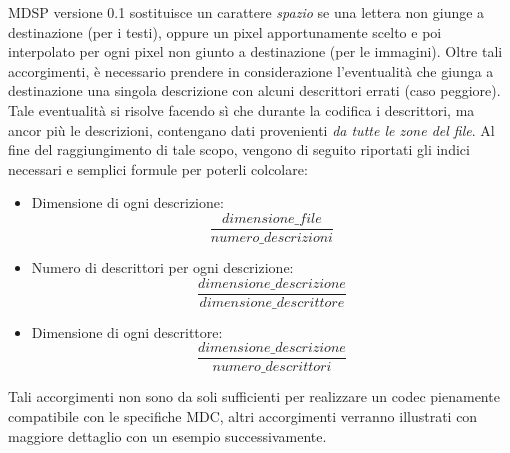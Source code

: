 MDSP versione 0.1 sostituisce un carattere \emph{spazio} se una lettera non giunge a destinazione (per i testi), oppure un pixel apportunamente scelto e poi interpolato per ogni pixel non giunto a destinazione (per le immagini). Oltre tali accorgimenti, è necessario prendere in considerazione l'eventualità che giunga a destinazione una singola descrizione con alcuni descrittori errati (caso peggiore). Tale eventualit\`a si risolve facendo s\`i che durante la codifica i descrittori, ma ancor pi\`u le descrizioni, contengano dati provenienti \emph{da tutte le zone del file}. Al fine del raggiungimento di tale scopo, vengono di seguito riportati gli indici necessari e semplici formule per poterli colcolare:
\begin{itemize}
 \item Dimensione di ogni descrizione: $$\frac{dimensione\_file}{numero\_descrizioni}$$
 \item Numero di descrittori per ogni descrizione: $$\frac{dimensione\_descrizione}{dimensione\_descrittore}$$
 \item Dimensione di ogni descrittore: $$\frac{dimensione\_descrizione}{numero\_descrittori}$$
\end{itemize}
Tali accorgimenti non sono da soli sufficienti per realizzare un codec pienamente compatibile con le specifiche MDC, altri accorgimenti verranno illustrati con maggiore dettaglio con un esempio successivamente.